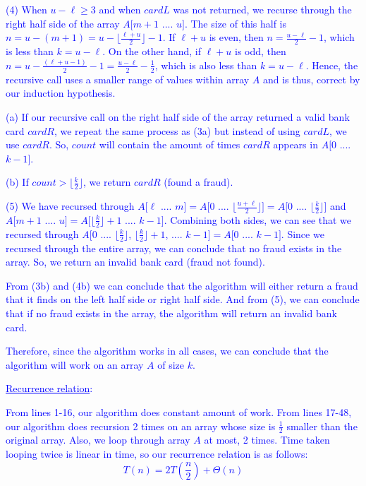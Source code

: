 \documentclass[11pt]{article}
\renewcommand{\blacksquare}{\textcolor{blue}{\openbox}}
\begin{document}
\begin{itemize}
\textcolor{blue}{ (4) When $u - \ell \geq 3$ and when $cardL$ was not returned, we recurse through the right half side of the array $A[m+1$ .... $u]$. The size of this half is $n=u-(m+1)=u-\lfloor \frac{\ell + u}{2} \rfloor - 1$. If $\ell + u$ is even, then $n=\frac{u-\ell}{2}-1$, which is less than $k=u-\ell$. On the other hand, if $\ell + u$ is odd, then $n=u- \frac{(\ell + u - 1)}{2} -1 = \frac{u-\ell}{2} - \frac{1}{2}$, which is also less than $k=u-\ell$. Hence, the recursive call uses a smaller range of values within array $A$ and is thus, correct by our induction hypothesis.}

\textcolor{blue}{\phantom{(4) } (a) If our recursive call on the right half side of the array returned a valid bank card $cardR$, we repeat the same process as (3a) but instead of using $cardL$, we use $cardR$. So, $count$ will contain the amount of times $cardR$ appears in $A[0$ .... $k - 1]$.}

\textcolor{blue}{\phantom{(4) } (b) If $count > \lfloor \frac{k}{2} \rfloor$, we return $cardR$ (found a fraud).}

\textcolor{blue}{(5) We have recursed through $A[\ell$ .... $m] = A[0$ .... $\lfloor \frac{u + \ell}{2} \rfloor ] = A[0$ .... $\lfloor \frac{k}{2} \rfloor]$ and $A[m+1$ .... $u] = A[\lfloor \frac{k}{2} \rfloor + 1$ .... $k-1]$. Combining both sides, we can see that we recursed through $A[0$ .... $\lfloor \frac{k}{2} \rfloor$, $\lfloor \frac{k}{2} \rfloor + 1$, .... $k-1] = A[0$ .... $k-1]$. Since we recursed through the entire array, we can conclude that no fraud exists in the array. So, we return an invalid bank card (fraud not found).}

\textcolor{blue}{ From (3b) and (4b) we can conclude that the algorithm will either return a fraud that it finds on the left half side or right half side. And from (5), we can conclude that if no fraud exists in the array, the algorithm will return an invalid bank card.}

\textcolor{blue}{ Therefore, since the algorithm works in all cases, we can conclude that the algorithm will work on an array $A$ of size $k$.\hspace{12.6cm}\blacksquare\\}

\textcolor{blue}{ \underline{Recurrence relation}:}

\textcolor{blue}{From lines 1-16, our algorithm does constant amount of work. From lines  17-48, our algorithm does recursion 2 times on an array whose size is $\frac{1}{2}$ smaller than the original array. Also, we loop through array $A$ at most, 2 times. Time taken looping twice is linear in time, so our recurrence relation is as follows: $$\boxed{T(n) = 2T(\frac{n}{2}) + \Theta(n)}$$}


\end{itemize}
\end{document}
